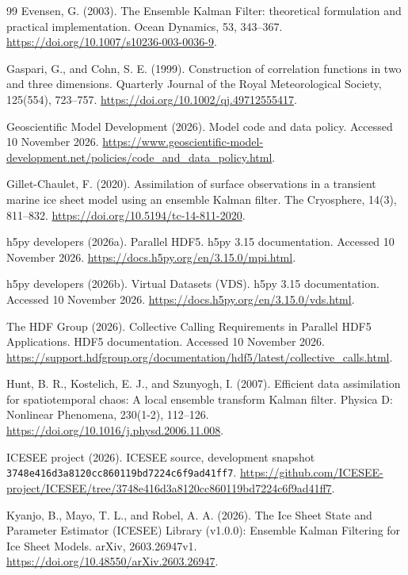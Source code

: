 \documentclass[11pt,a4paper]{article}
\newcommand{\code}[1]{\nolinkurl{#1}}
\begin{document}
\begin{thebibliography}{99}
 Evensen, G. (2003). The Ensemble Kalman Filter: theoretical formulation and practical implementation. Ocean Dynamics, 53, 343--367. \url{https://doi.org/10.1007/s10236-003-0036-9}.

 Gaspari, G., and Cohn, S. E. (1999). Construction of correlation functions in two and three dimensions. Quarterly Journal of the Royal Meteorological Society, 125(554), 723--757. \url{https://doi.org/10.1002/qj.49712555417}.

 Geoscientific Model Development (2026). Model code and data policy. Accessed 10 November 2026. \url{https://www.geoscientific-model-development.net/policies/code_and_data_policy.html}.

 Gillet-Chaulet, F. (2020). Assimilation of surface observations in a transient marine ice sheet model using an ensemble Kalman filter. The Cryosphere, 14(3), 811--832. \url{https://doi.org/10.5194/tc-14-811-2020}.

 h5py developers (2026a). Parallel HDF5. h5py 3.15 documentation. Accessed 10 November 2026. \url{https://docs.h5py.org/en/3.15.0/mpi.html}.

 h5py developers (2026b). Virtual Datasets (VDS). h5py 3.15 documentation. Accessed 10 November 2026. \url{https://docs.h5py.org/en/3.15.0/vds.html}.

 The HDF Group (2026). Collective Calling Requirements in Parallel HDF5 Applications. HDF5 documentation. Accessed 10 November 2026. \url{https://support.hdfgroup.org/documentation/hdf5/latest/collective_calls.html}.

 Hunt, B. R., Kostelich, E. J., and Szunyogh, I. (2007). Efficient data assimilation for spatiotemporal chaos: A local ensemble transform Kalman filter. Physica D: Nonlinear Phenomena, 230(1-2), 112--126. \url{https://doi.org/10.1016/j.physd.2006.11.008}.

 ICESEE project (2026). ICESEE source, development snapshot \code{3748e416d3a8120cc860119bd7224c6f9ad41ff7}. \url{https://github.com/ICESEE-project/ICESEE/tree/3748e416d3a8120cc860119bd7224c6f9ad41ff7}.

 Kyanjo, B., Mayo, T. L., and Robel, A. A. (2026). The Ice Sheet State and Parameter Estimator (ICESEE) Library (v1.0.0): Ensemble Kalman Filtering for Ice Sheet Models. arXiv, 2603.26947v1. \url{https://doi.org/10.48550/arXiv.2603.26947}.


\end{thebibliography}
\end{document}
